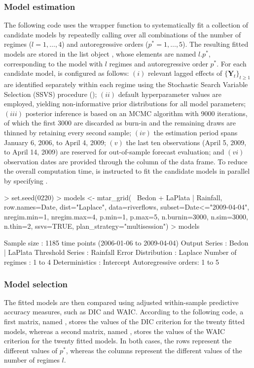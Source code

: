 \subsubsection{Model estimation}
The following code uses the wrapper function  to systematically fit a collection of candidate models by repeatedly calling  over all combinations of the number of regimes ($l=1,\ldots,4$) and autoregressive orders ($p^*=1,\ldots,5$). The resulting fitted models are stored in the list object , whose elements are named $l.p^*$, corresponding to the model with $l$ regimes and autoregressive order $p^*$.
For each candidate model,  is configured as follows: $(i)$ relevant lagged effects of $\{\bm{Y}_t\}_{t\geq 1}$ are identified separately within each regime using the Stochastic Search Variable Selection (SSVS) procedure (); $(ii)$ default hyperparameter values are employed, yielding non-informative prior distributions for all model parameters; $(iii)$ posterior inference is based on an MCMC algorithm with 9000 iterations, of which the first 3000 are discarded as burn-in and the remaining draws are thinned by retaining every second sample; $(iv)$ the estimation period spans January 6, 2006, to April 4, 2009; $(v)$ the last ten observations (April 5, 2009, to April 14, 2009) are reserved for out-of-sample forecast evaluation; and $(vi)$ observation dates are provided through the  column of the  data frame. To reduce the overall computation time,  is instructed to fit the candidate models in parallel by specifying .
\begin{example}
> set.seed(0220)
> models <- mtar_grid(~ Bedon + LaPlata | Rainfall, row.names=Date, dist="Laplace",
                      data=riverflows, subset={Date<="2009-04-04"}, nregim.min=1, 
                      nregim.max=4, p.min=1, p.max=5, n.burnin=3000, n.sim=3000, 
                      n.thin=2, ssvs=TRUE, plan_strategy="multisession")
> models

Sample size          : 1185 time points (2006-01-06 to 2009-04-04)
Output Series        : Bedon    |    LaPlata
Threshold Series     : Rainfall
Error Distribution   : Laplace
Number of regimes    : 1 to 4
Deterministics       : Intercept  
Autoregressive orders: 1 to 5
\end{example}

\subsubsection{Model selection}
The fitted models are then compared using adjusted within-sample predictive accuracy measures, such as DIC and WAIC. According to the following code, a first matrix, named , stores the values of the DIC criterion for the twenty fitted models, whereas a second matrix, named , stores the values of the WAIC criterion for the twenty fitted models. In both cases, the rows represent the different values of $p^*$, whereas the columns represent the different values of the number of regimes $l$.

